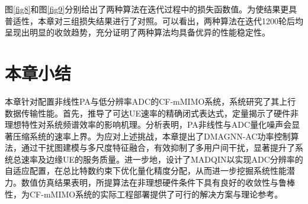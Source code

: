 图\ref{fig8}和图\ref{fig9}分别给出了两种算法在迭代过程中的损失函数值。为使结果更具普适性，本章对三组损失结果进行了对照。可以看出，两种算法在迭代1200轮后均呈现出明显的收敛趋势，充分证明了两种算法均具备优异的性能稳定性。

\section{本章小结}
本章针对配置非线性PA与低分辨率ADC的CF-mMIMO系统，系统研究了其上行数据传输性能。首先，推导了可达UE速率的精确闭式表达式，定量揭示了硬件非理想特性对系统频谱效率的影响机理。分析表明，PA非线性与ADC量化噪声会显著压缩系统的速率上界。为应对上述挑战，本章提出了DMAGNN-AC功率控制算法，通过干扰图建模与多尺度特征融合，有效抑制了多用户间干扰，显著提升了系统总速率及边缘UE的服务质量。进一步地，设计了MADQIN以实现ADC分辨率的自适应配置，在总比特数约束下优化量化精度分配，从而进一步挖掘系统性能潜力。数值仿真结果表明，所提算法在非理想硬件条件下具有良好的收敛性与鲁棒性，为CF-mMIMO系统的实际工程部署提供了可行的解决方案与理论参考。
